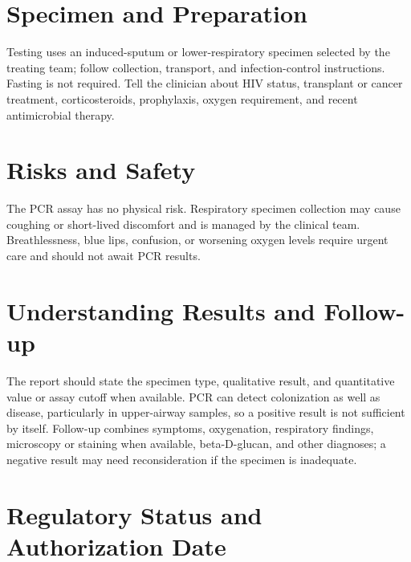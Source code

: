 \section*{Specimen and Preparation}
Testing uses an induced-sputum or lower-respiratory specimen selected by the treating team; follow collection, transport, and infection-control instructions. Fasting is not required. Tell the clinician about HIV status, transplant or cancer treatment, corticosteroids, prophylaxis, oxygen requirement, and recent antimicrobial therapy.

\section*{Risks and Safety}
The PCR assay has no physical risk. Respiratory specimen collection may cause coughing or short-lived discomfort and is managed by the clinical team. Breathlessness, blue lips, confusion, or worsening oxygen levels require urgent care and should not await PCR results.

\section*{Understanding Results and Follow-up}
The report should state the specimen type, qualitative result, and quantitative value or assay cutoff when available. PCR can detect colonization as well as disease, particularly in upper-airway samples, so a positive result is not sufficient by itself. Follow-up combines symptoms, oxygenation, respiratory findings, microscopy or staining when available, beta-D-glucan, and other diagnoses; a negative result may need reconsideration if the specimen is inadequate.

\section*{Regulatory Status and Authorization Date}

\clearpage
